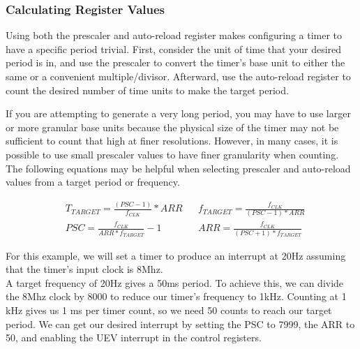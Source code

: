 \documentclass[11pt,fleqn]{book} %
\begin{document}
    \subsubsection{Calculating Register Values}
        Using both the prescaler and auto-reload register makes configuring a timer to have a specific period trivial. First, consider the unit of time that your desired period is in, and use the prescaler to convert the timer's base unit to either the same or a convenient multiple/divisor. Afterward, use the auto-reload register to count the desired number of time units to make the target period. 
        
        If you are attempting to generate a very long period, you may have to use larger or more granular base units because the physical size of the timer may not be sufficient to count that high at finer resolutions. However, in many cases, it is possible to use small prescaler values to have finer granularity when counting.
        The following equations may be helpful when selecting prescaler and auto-reload values from a target period or frequency. 
        
        \begin{align*}
            & T_{TARGET} = \frac{(PSC-1)}{f_{CLK}} * ARR & & f_{TARGET} = \frac{f_{CLK}}{(PSC-1) * ARR}\\[1em]
            & PSC = \frac{f_{CLK}}{ARR * f_{TARGET}}-1 & & ARR = \frac{f_{CLK}}{(PSC+1) * f_{TARGET}}
        \end{align*}
        	
            
        \begin{center}
            \begin{example} 
            For this example, we will set a timer to produce an interrupt at 20Hz assuming that the timer's input clock is 8Mhz. \\
            
            A target frequency of 20Hz gives a 50ms period. To achieve this, we can divide the 8Mhz clock by 8000 to reduce our timer's frequency to 1kHz. Counting at 1 kHz gives us 1 ms per timer count, so we need 50 counts to reach our target period. We can get our desired interrupt by setting the PSC to 7999, the ARR to 50, and enabling the UEV interrupt in the control registers.  
            \end{example}
        \end{center}
        
\end{document}
